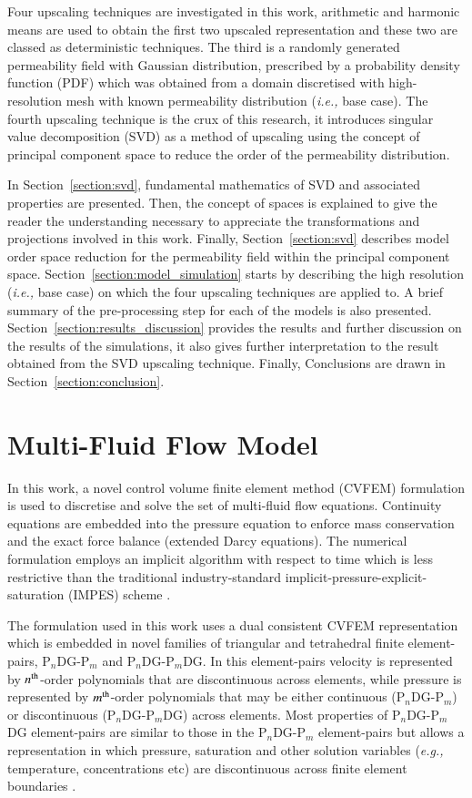 \documentclass[preprint,12pt]{elsarticle}
\newcommand{\PN}[2][error]{P$_{#1}$DG-P$_{#2}$}
\newcommand{\PNDG}[2][error]{P$_{#1}$DG-P$_{#2}$DG}
\newcommand{\eg}{{\it e.g., }}
\newcommand{\ie}{{\it i.e., }}
\begin{document}
Four upscaling techniques are investigated in this work, arithmetic and harmonic means are used to obtain the first two upscaled representation and these two are classed as deterministic techniques. The third is a randomly generated permeability field with Gaussian distribution, prescribed by a probability density function (PDF) which was obtained from a domain discretised with high-resolution mesh with known permeability distribution (\ie base case). The fourth upscaling technique is the crux of this research, it introduces singular value decomposition (SVD) as a method of upscaling using the concept of principal component space to reduce the order of the permeability distribution.

In Section~\ref{section:svd}, fundamental mathematics of SVD and associated properties are presented. Then, the concept of spaces is explained to give the reader the understanding necessary to appreciate the transformations and projections involved in this work. Finally, Section~\ref{section:svd} describes model order space reduction for the permeability field within the principal component space. Section~\ref{section:model_simulation} starts by describing the high resolution (\ie base case) on which the four upscaling techniques are applied to. A brief summary of the pre-processing step for each of the models is also presented. Section~\ref{section:results_discussion} provides the results and further discussion on the results of the simulations, it also gives further interpretation to the result obtained from the SVD upscaling technique. Finally, Conclusions are drawn in Section~\ref{section:conclusion}.

\section{Multi-Fluid Flow Model}\label{section:mathematical_model}

In this work, a novel control volume finite element method (CVFEM) formulation is used to discretise and solve the set of multi-fluid flow equations. Continuity equations are embedded into the pressure equation to enforce mass conservation and the exact force balance (extended Darcy equations). The numerical formulation employs an implicit algorithm with respect to time which is less restrictive than the traditional industry-standard implicit-pressure-explicit-saturation (IMPES) scheme \cite{aziz_1986,geiger_2004}.

The formulation used in this work uses a dual consistent CVFEM representation which is embedded in novel families of triangular and tetrahedral finite element-pairs, \PN[n]{m} and \PNDG[n]{m}. In this element-pairs velocity is represented by $n^{\rm th}$-order polynomials that are discontinuous across elements, while pressure is represented by $m^{\rm th}$-order polynomials that may be either continuous (\PN[n]{m}) or discontinuous (\PNDG[n]{m}) across elements. Most properties of \PNDG[n]{m} element-pairs are similar to those in the \PN[n]{m} element-pairs but allows a representation in which pressure, saturation and other solution variables (\eg temperature, concentrations etc) are discontinuous across finite element boundaries \cite{salinas_2018,adam_2016}.
\end{document}
